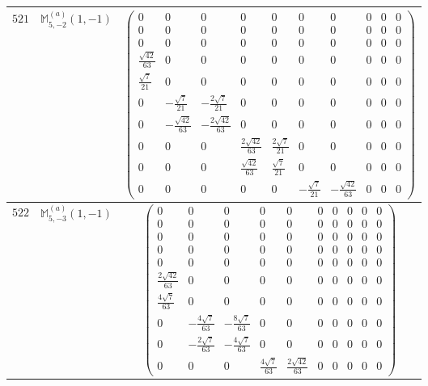 \documentclass[fleqn,8pt,landscape]{jsarticle}
\begin{document}
\begin{center}
\begin{longtable}{ccc}
$ 521 $ & $ \mathbb{M}_{5,-2}^{(a)}(1,-1) $ & $ \begin{pmatrix} 0 & 0 & 0 & 0 & 0 & 0 & 0 & 0 & 0 & 0 \\ 0 & 0 & 0 & 0 & 0 & 0 & 0 & 0 & 0 & 0 \\ 0 & 0 & 0 & 0 & 0 & 0 & 0 & 0 & 0 & 0 \\ \frac{\sqrt{42}}{63} & 0 & 0 & 0 & 0 & 0 & 0 & 0 & 0 & 0 \\ \frac{\sqrt{7}}{21} & 0 & 0 & 0 & 0 & 0 & 0 & 0 & 0 & 0 \\ 0 & - \frac{\sqrt{7}}{21} & - \frac{2 \sqrt{7}}{21} & 0 & 0 & 0 & 0 & 0 & 0 & 0 \\ 0 & - \frac{\sqrt{42}}{63} & - \frac{2 \sqrt{42}}{63} & 0 & 0 & 0 & 0 & 0 & 0 & 0 \\ 0 & 0 & 0 & \frac{2 \sqrt{42}}{63} & \frac{2 \sqrt{7}}{21} & 0 & 0 & 0 & 0 & 0 \\ 0 & 0 & 0 & \frac{\sqrt{42}}{63} & \frac{\sqrt{7}}{21} & 0 & 0 & 0 & 0 & 0 \\ 0 & 0 & 0 & 0 & 0 & - \frac{\sqrt{7}}{21} & - \frac{\sqrt{42}}{63} & 0 & 0 & 0 \end{pmatrix} $ \\ \hline
$ 522 $ & $ \mathbb{M}_{5,-3}^{(a)}(1,-1) $ & $ \begin{pmatrix} 0 & 0 & 0 & 0 & 0 & 0 & 0 & 0 & 0 & 0 \\ 0 & 0 & 0 & 0 & 0 & 0 & 0 & 0 & 0 & 0 \\ 0 & 0 & 0 & 0 & 0 & 0 & 0 & 0 & 0 & 0 \\ 0 & 0 & 0 & 0 & 0 & 0 & 0 & 0 & 0 & 0 \\ 0 & 0 & 0 & 0 & 0 & 0 & 0 & 0 & 0 & 0 \\ \frac{2 \sqrt{42}}{63} & 0 & 0 & 0 & 0 & 0 & 0 & 0 & 0 & 0 \\ \frac{4 \sqrt{7}}{63} & 0 & 0 & 0 & 0 & 0 & 0 & 0 & 0 & 0 \\ 0 & - \frac{4 \sqrt{7}}{63} & - \frac{8 \sqrt{7}}{63} & 0 & 0 & 0 & 0 & 0 & 0 & 0 \\ 0 & - \frac{2 \sqrt{7}}{63} & - \frac{4 \sqrt{7}}{63} & 0 & 0 & 0 & 0 & 0 & 0 & 0 \\ 0 & 0 & 0 & \frac{4 \sqrt{7}}{63} & \frac{2 \sqrt{42}}{63} & 0 & 0 & 0 & 0 & 0 \end{pmatrix} $ \\ \hline

\end{longtable}
\end{center}
\end{document}

